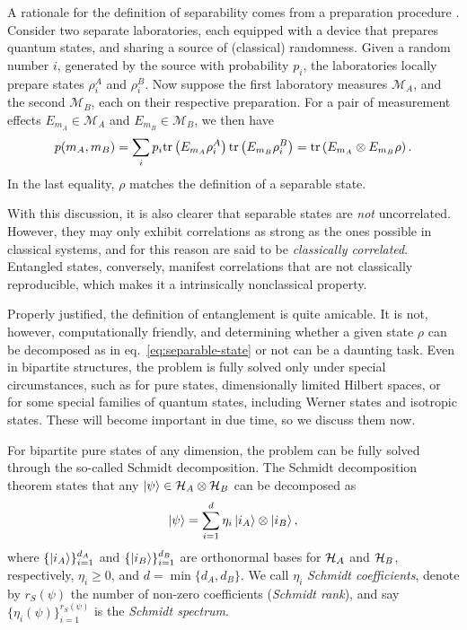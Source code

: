 		A rationale for the definition of separability comes from a preparation procedure \cite{werner_1989}. Consider two separate laboratories, each equipped with a device that prepares quantum states, and sharing a source of (classical) randomness. Given a random number $i$, generated by the source with probability $p_i$, the laboratories locally prepare states $\rho_i^A$ and $\rho_i^B$. Now suppose the first laboratory measures $\mathcal{M}_A$, and the second $\mathcal{M}_B$, each on their respective preparation. For a pair of measurement effects $E_{m_A} \in \mathcal{M}_A$ and $E_{m_B} \in \mathcal{M}_B$, we then have
		$$
			p(m_A, m_B) = \sum_i p_i \text{tr}\left( E_{m_A} \rho_i^A \right) \text{tr}\left( E_{m_B} \rho_i^B \right) = \text{tr}\left(  E_{m_A} \otimes E_{m_B} \rho \right) .
		$$
		In the last equality, $\rho$ matches the definition of a separable state.
		
		With this discussion, it is also clearer that separable states are \emph{not} uncorrelated. However, they may only exhibit correlations as strong as the ones possible in classical systems, and for this reason are said to be \emph{classically correlated}. Entangled states, conversely, manifest correlations that are not classically reproducible, which makes it a intrinsically nonclassical property.
	
		Properly justified, the definition of entanglement is quite amicable. It is not, however, computationally friendly, and determining whether a given state $\rho$ can be decomposed as in eq.~\eqref{eq:separable-state} or not can be a daunting task. Even in bipartite structures, the problem is fully solved only under special circumstances, such as for pure states, dimensionally limited Hilbert spaces, or for some special families of quantum states, including Werner states and isotropic states. These will become important in due time, so we discuss them now.
	
		For bipartite pure states of any dimension, the problem can be fully solved through the so-called Schmidt decomposition. The Schmidt decomposition theorem states that any $\ket{\psi} \in \mathcal{H}_A \otimes \mathcal{H}_B$ can be decomposed as
		\begin{equation}
			\ket{\psi} = \sum_{i=1}^d \eta_i \ket{i_A} \otimes \ket{i_B} ,
			\label{eq:schmidt-decomposition}
		\end{equation}
		where $\{ \ket{i_A} \}_{i=1}^{d_A}$ and $\{ \ket{i_B} \}_{i=1}^{d_B}$ are orthonormal bases for $\mathcal{H}_A$ and $\mathcal{H}_B$, respectively, $\eta_i \geq 0$, and $d = \min \{d_A, d_B\}$. We call $\eta_i$ \emph{Schmidt coefficients}, denote by $r_S(\psi)$ the number of non-zero coefficients (\emph{Schmidt rank}), and say $\{ \eta_i (\psi) \}_{i=1}^{r_S(\psi)}$ is the \emph{Schmidt spectrum}.
	
